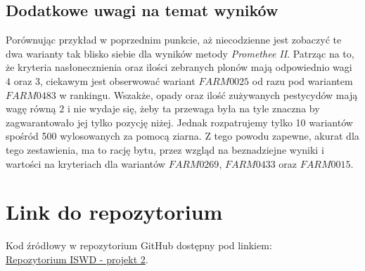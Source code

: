 \documentclass[11pt]{article}
\begin{document}
\subsection{Dodatkowe uwagi na temat wyników}
Porównując przykład w poprzednim punkcie, aż niecodzienne jest zobaczyć te dwa warianty tak blisko siebie dla wyników metody \textit{Promethee II}. Patrząc na to, że kryteria nasłonecznienia oraz ilości zebranych plonów mają odpowiednio wagi $4$ oraz $3$, ciekawym jest obserwować wariant $FARM0025$ od razu pod wariantem $FARM0483$ w rankingu. Wszakże, opady oraz ilość zużywanych pestycydów mają wagę równą $2$ i nie wydaje się, żeby ta przewaga była na tyle znaczna by zagwarantowało jej tylko pozycję niżej. Jednak rozpatrujemy tylko 10 wariantów spośród 500 wylosowanych za pomocą ziarna. Z tego powodu zapewne, akurat dla tego zestawienia, ma to rację bytu, przez wzgląd na beznadziejne wyniki i wartości na kryteriach dla wariantów $FARM0269$, $FARM0433$ oraz $FARM0015$.

\section{Link do repozytorium}\label{sec:link-do-repo}
Kod źródłowy w repozytorium GitHub dostępny pod linkiem: \\
\href{https://github.com/KotZPolibudy/PUT_ISWD/tree/main/projekt2}{Repozytorium ISWD - projekt 2}.
\end{document}
